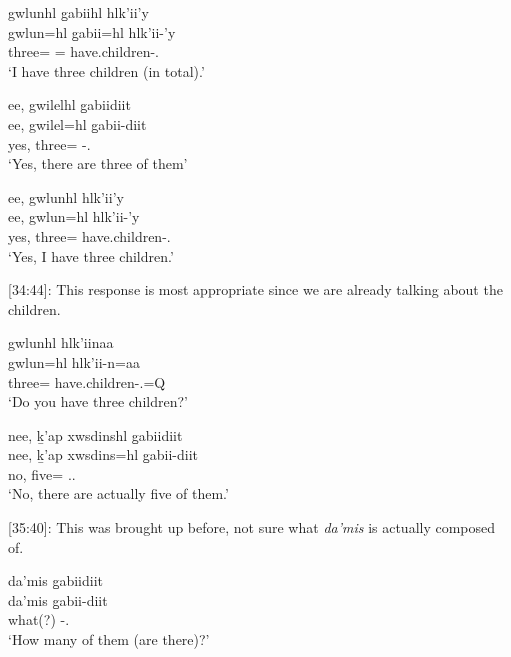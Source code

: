 \begin{exe}
    \ex
    \begin{xlist}
    \item \glll gwlunhl g̱abiihl hlk'ii'y \\
    gwlun=hl g̱abii=hl hlk'ii-'y \\
    three=\Cn{} \Cnt{}=\Cn{} have.children-\Fsg{}.\Ii{} \\
    `I have three children (in total).' 
    \item \glll ee, gwilelhl g̱abiidiit \\
                ee, gwilel=hl g̱abii-diit \\
                yes, three=\Cn{} \Cnt{}-\Tpl{}.\Ii{} \\
            `Yes, there are three of them'
    \item \glll ee, gwlunhl hlk'ii'y \\
    ee, gwlun=hl hlk'ii-'y \\
    yes, three=\Cn{} have.children-\Fsg{}.\Ii{} \\
    `Yes, I have three children.'
    \end{xlist}
\end{exe}

[34:44]: This response is most appropriate since we are already talking about the children.

\begin{exe}
    \ex
    \begin{xlist}
    \item \glll gwlunhl hlk'iinaa \\
    gwlun=hl hlk'ii-n=aa \\
    three=\Cn{} have.children-\Ssg{}.\Ii{}=Q{} \\
    `Do you have three children?' 
    \item \glll nee, ḵ'ap xwsdinshl g̱abiidiit \\
    nee, ḵ'ap xwsdins=hl g̱abii-diit \\
    no, \Verum{} five=\Cn{} \Cnt{}.\Tpl{}.\Ii{} \\
    `No, there are actually five of them.'
    \end{xlist}
\end{exe}

[35:40]: This was brought up before, not sure what \textit{da'mis} is actually composed of.

\begin{exe}
    \ex \glll da'mis g̱abiidiit  \\
    da'mis g̱abii-diit  \\
    what(?) \Cnt{}-\Tpl{}.\Ii{} \\
    `How many of them (are there)?'
\end{exe}

